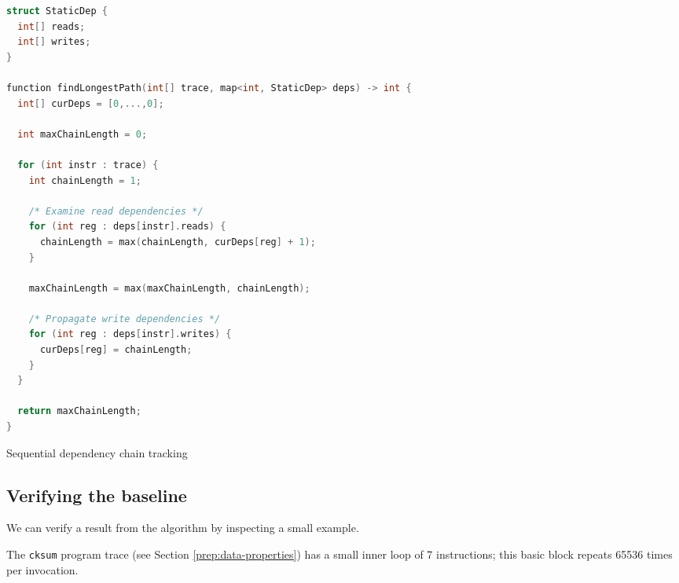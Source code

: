 \begin{algfloat}[ht]
\begin{lstlisting}[language=C++]
struct StaticDep {
  int[] reads;
  int[] writes;
}

function findLongestPath(int[] trace, map<int, StaticDep> deps) -> int {
  int[] curDeps = [0,...,0];

  int maxChainLength = 0;

  for (int instr : trace) {
    int chainLength = 1;

    /* Examine read dependencies */
    for (int reg : deps[instr].reads) {
      chainLength = max(chainLength, curDeps[reg] + 1);
    }

    maxChainLength = max(maxChainLength, chainLength);

    /* Propagate write dependencies */
    for (int reg : deps[instr].writes) {
      curDeps[reg] = chainLength;
    }
  }

  return maxChainLength;
}
\end{lstlisting}
\caption{Sequential dependency chain tracking}
\label{alg:naive-baseline}
\end{algfloat}

\subsection{Verifying the baseline}

We can verify a result from the algorithm by inspecting a small example.

The \verb|cksum| program trace (see Section \ref{prep:data-properties}) has a small inner loop of 
7 instructions; this basic block repeats 65536 times per invocation.


